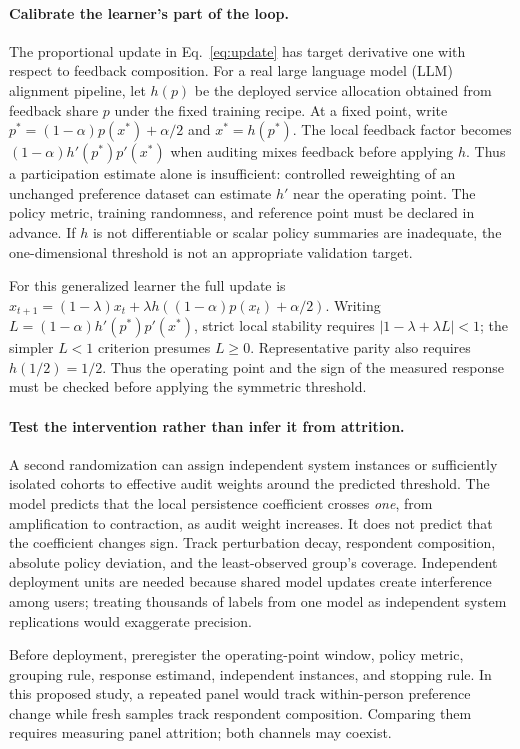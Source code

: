 \documentclass{article}
\begin{document}
\paragraph{Calibrate the learner's part of the loop.}
The proportional update in Eq.~\eqref{eq:update} has target derivative one with respect to feedback composition. For a real large language model (LLM) alignment pipeline, let $h(p)$ be the deployed service allocation obtained from feedback share $p$ under the fixed training recipe. At a fixed point, write $p^*=(1-\alpha)p(x^*)+\alpha/2$ and $x^*=h(p^*)$. The local feedback factor becomes $(1-\alpha)h'(p^*)p'(x^*)$ when auditing mixes feedback before applying $h$. Thus a participation estimate alone is insufficient: controlled reweighting of an unchanged preference dataset can estimate $h'$ near the operating point. The policy metric, training randomness, and reference point must be declared in advance. If $h$ is not differentiable or scalar policy summaries are inadequate, the one-dimensional threshold is not an appropriate validation target.

For this generalized learner the full update is $x_{t+1}=(1-\lambda)x_t+\lambda h((1-\alpha)p(x_t)+\alpha/2)$. Writing $L=(1-\alpha)h'(p^*)p'(x^*)$, strict local stability requires $|1-\lambda+\lambda L|<1$; the simpler $L<1$ criterion presumes $L\ge0$. Representative parity also requires $h(1/2)=1/2$. Thus the operating point and the sign of the measured response must be checked before applying the symmetric threshold.

\paragraph{Test the intervention rather than infer it from attrition.}
A second randomization can assign independent system instances or sufficiently isolated cohorts to effective audit weights around the predicted threshold. The model predicts that the local persistence coefficient crosses \emph{one}, from amplification to contraction, as audit weight increases. It does not predict that the coefficient changes sign. Track perturbation decay, respondent composition, absolute policy deviation, and the least-observed group's coverage. Independent deployment units are needed because shared model updates create interference among users; treating thousands of labels from one model as independent system replications would exaggerate precision.

Before deployment, preregister the operating-point window, policy metric, grouping rule, response estimand, independent instances, and stopping rule. In this proposed study, a repeated panel would track within-person preference change while fresh samples track respondent composition. Comparing them requires measuring panel attrition; both channels may coexist.
\end{document}
